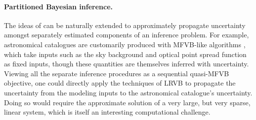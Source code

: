 \paragraph{Partitioned Bayesian inference.}

The ideas of \citep{giordano:2018:covariances} can be naturally extended to
approximately propagate uncertainty amongst separately estimated components of
an inference problem.  For example, astronomical catalogues are customarily
produced with MFVB-like algorithms \citep{lang:2016:tractor,
regier:2019:cataloging}, which take inputs such as the sky background
and optical point spread function as fixed inputs, though these quantities
are themselves inferred with uncertainty.  Viewing all the separate inference
procedures as a sequential quasi-MFVB objective, one could directly apply
the techniques of LRVB to propagate the uncertainty from the modeling inputs
to the astronomical catalogue's uncertainty.  Doing so would require the
approximate solution of a very large, but very sparse, linear system,
which is itself an interesting computational challenge.











